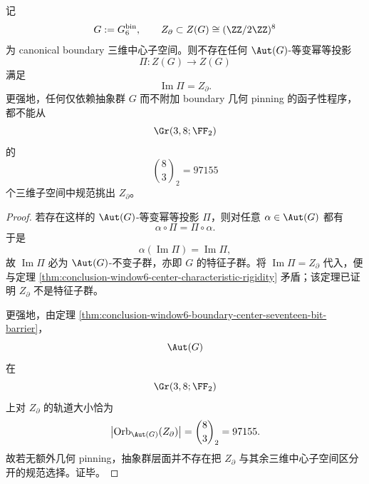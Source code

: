 \begin{theorem}\label{thm:conclusion-window6-boundary-subspace-no-aut-equivariant-projector}
记
\[
G:=G_6^{\mathrm{bin}},
\qquad
Z_{\partial}\subset Z(G)\cong (\ZZ/2\ZZ)^8
\]
为 canonical boundary 三维中心子空间。则不存在任何 \(\Aut(G)\)-等变幂等投影
\[
\Pi:Z(G)\to Z(G)
\]
满足
\[
\operatorname{Im}\Pi=Z_{\partial}.
\]
更强地，任何仅依赖抽象群 \(G\) 而不附加 boundary 几何 pinning 的函子性程序，都不能从
\[
\Gr(3,8;\FF_2)
\]
的
\[
\binom{8}{3}_2=97155
\]
个三维子空间中规范挑出 \(Z_{\partial}\)。
\end{theorem}
\begin{proof}
若存在这样的 \(\Aut(G)\)-等变幂等投影 \(\Pi\)，则对任意 \(\alpha\in\Aut(G)\) 都有
\[
\alpha\circ \Pi=\Pi\circ \alpha.
\]
于是
\[
\alpha(\operatorname{Im}\Pi)=\operatorname{Im}\Pi,
\]
故 \(\operatorname{Im}\Pi\) 必为 \(\Aut(G)\)-不变子群，亦即 \(G\) 的特征子群。将 \(\operatorname{Im}\Pi=Z_{\partial}\) 代入，便与定理 \ref{thm:conclusion-window6-center-characteristic-rigidity} 矛盾；该定理已证明 \(Z_{\partial}\) 不是特征子群。

更强地，由定理 \ref{thm:conclusion-window6-boundary-center-seventeen-bit-barrier}，
\[
\Aut(G)
\]
在
\[
\Gr(3,8;\FF_2)
\]
上对 \(Z_{\partial}\) 的轨道大小恰为
\[
\bigl|\operatorname{Orb}_{\Aut(G)}(Z_{\partial})\bigr|
=
\binom{8}{3}_2
=
97155.
\]
故若无额外几何 pinning，抽象群层面并不存在把 \(Z_{\partial}\) 与其余三维中心子空间区分开的规范选择。证毕。
\end{proof}


